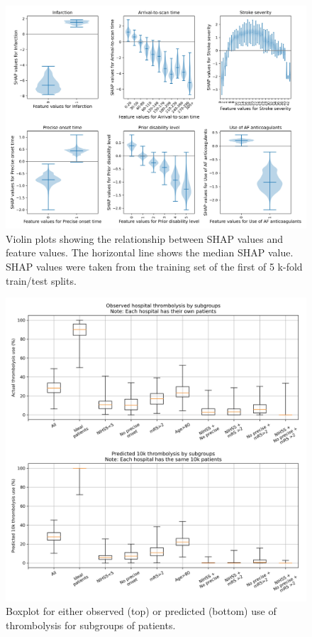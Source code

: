 \begin{figure}
\centering
\includegraphics[width=1\textwidth]{./images/03_xgb_10_features_thrombolysis_shap_violin}
\caption{Violin plots showing the relationship between SHAP values and feature values. The horizontal line shows the median SHAP value. SHAP values were taken from the training set of the first of 5 k-fold train/test splits.}
\end{figure}


\begin{figure}
\centering
\includegraphics[width=1\textwidth]{./images/15a_actual_vs_modelled_subgroup_violin}
\caption{Boxplot for either observed (top) or predicted (bottom) use of thrombolysis for subgroups of patients.}
\end{figure}

